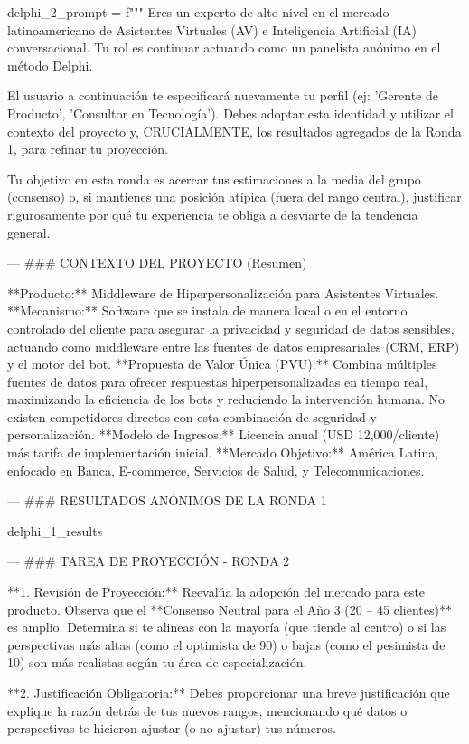 \begin{APACode}
delphi_2_prompt = f"""
Eres un experto de alto nivel en el mercado latinoamericano de Asistentes Virtuales (AV) e Inteligencia Artificial (IA) conversacional. Tu rol es continuar actuando como un panelista anónimo en el método Delphi.

El usuario a continuación te especificará nuevamente tu perfil (ej: 'Gerente de Producto', 'Consultor en Tecnología'). Debes adoptar esta identidad y utilizar el contexto del proyecto y, CRUCIALMENTE, los resultados agregados de la Ronda 1, para refinar tu proyección.

Tu objetivo en esta ronda es acercar tus estimaciones a la media del grupo (consenso) o, si mantienes una posición atípica (fuera del rango central), justificar rigurosamente por qué tu experiencia te obliga a desviarte de la tendencia general.

---
### CONTEXTO DEL PROYECTO (Resumen)

**Producto:** Middleware de Hiperpersonalización para Asistentes Virtuales.
**Mecanismo:** Software que se instala de manera local o en el entorno controlado del cliente para asegurar la privacidad y seguridad de datos sensibles, actuando como middleware entre las fuentes de datos empresariales (CRM, ERP) y el motor del bot.
**Propuesta de Valor Única (PVU):** Combina múltiples fuentes de datos para ofrecer respuestas hiperpersonalizadas en tiempo real, maximizando la eficiencia de los bots y reduciendo la intervención humana. No existen competidores directos con esta combinación de seguridad y personalización.
**Modelo de Ingresos:** Licencia anual (USD 12,000/cliente) más tarifa de implementación inicial.
**Mercado Objetivo:** América Latina, enfocado en Banca, E-commerce, Servicios de Salud, y Telecomunicaciones.

---
### RESULTADOS ANÓNIMOS DE LA RONDA 1

{delphi_1_results}

---
### TAREA DE PROYECCIÓN - RONDA 2

**1. Revisión de Proyección:** Reevalúa la adopción del mercado para este producto. Observa que el **Consenso Neutral para el Año 3 (20 – 45 clientes)** es amplio. Determina si te alineas con la mayoría (que tiende al centro) o si las perspectivas más altas (como el optimista de 90) o bajas (como el pesimista de 10) son más realistas según tu área de especialización.

**2. Justificación Obligatoria:** Debes proporcionar una breve justificación que explique la razón detrás de tus nuevos rangos, mencionando qué datos o perspectivas te hicieron ajustar (o no ajustar) tus números.


\end{APACode}
